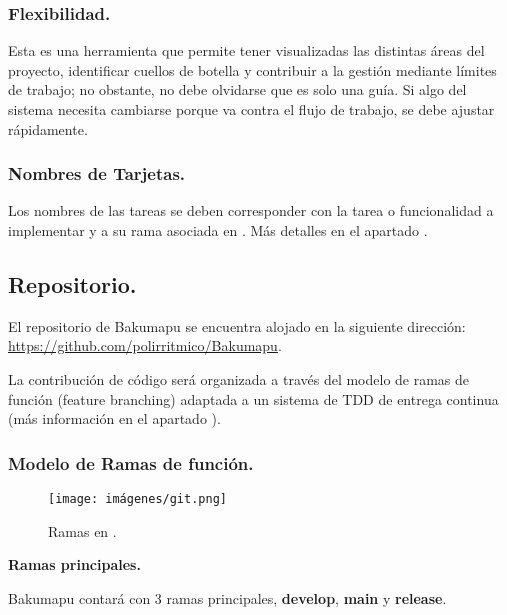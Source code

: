 \subsubsection{Flexibilidad.}\label{flujo:flexibilidad}
Esta es una herramienta que permite tener visualizadas las distintas áreas del proyecto, identificar cuellos de botella y contribuir a la gestión mediante límites de trabajo; no obstante, no debe olvidarse que es solo una guía. Si algo del sistema necesita cambiarse porque va contra el flujo de trabajo, se debe ajustar rápidamente.

\subsubsection{Nombres de Tarjetas.}\label{flujo:nombres-de-tarjetas}
Los nombres de las tareas se deben corresponder con la tarea o funcionalidad a implementar y a su rama asociada en . Más detalles en el apartado .

\pagebreak
\subsection{Repositorio.}\label{flujo:repositorio}
El repositorio  de Bakumapu se encuentra alojado en la siguiente dirección: \url{https://github.com/polirritmico/Bakumapu}.

La contribución de código será organizada a través del modelo de ramas de función (feature branching) adaptada a un sistema de TDD de entrega continua (más información en el apartado ).

\subsubsection{Modelo de Ramas de función.}\label{flujo:modelo-de-ramas}
\begin{figure}[H]
	\centering
	\texttt{[image: imágenes/git.png]}
	\caption{Ramas en .}
\end{figure}

\noindent\textbf{Ramas principales.}\label{pg:ramas-principales}

Bakumapu contará con 3 ramas principales, \textbf{develop}, \textbf{main} y \textbf{release}.

